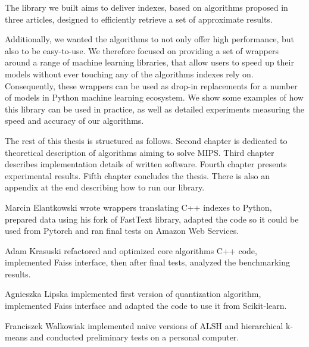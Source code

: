 The library we built aims to deliver indexes, based on algorithms proposed in three articles,
designed to efficiently retrieve a set of approximate results.

Additionally, we wanted the algorithms to not only offer high performance, but also to be easy-to-use. We therefore
focused on providing a set of wrappers around a range of machine learning libraries, that allow users to
speed up their models without ever touching any of the algorithms indexes rely on. Consequently,
these wrappers can be used as drop-in replacements for a number of models in Python machine learning ecosystem.
We show some examples of how this library can be used in practice,
as well as detailed experiments measuring the speed and accuracy of our algorithms.

The rest of this thesis is structured as follows.
Second chapter is dedicated to theoretical description of algorithms aiming to solve MIPS.
Third chapter describes implementation details of written software.
Fourth chapter presents experimental results.
Fifth chapter concludes the thesis.
There is also an appendix at the end describing how to run our library.

Marcin Elantkowski wrote wrappers translating C++ indexes to Python, prepared data using his fork of FastText
library, adapted the code so it could be used from Pytorch and ran final tests on Amazon Web Services.

Adam Krasuski refactored and optimized core algorithms C++ code, implemented Faiss interface,
then after final tests, analyzed the benchmarking results.

Agnieszka Lipska implemented first version of quantization algorithm, implemented Faiss interface and
adapted the code to use it from Scikit-learn.

Franciszek Walkowiak implemented naive versions of ALSH and hierarchical \mbox{k-means} and conducted
preliminary tests on a personal computer.

